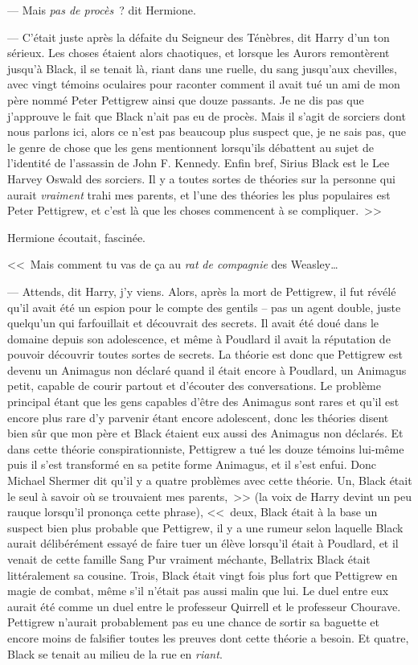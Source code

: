 --- Mais \emph{pas de procès}~? dit Hermione.

--- C'était juste après la défaite du Seigneur des Ténèbres, dit Harry d'un ton sérieux. Les choses étaient alors chaotiques, et lorsque les Aurors remontèrent jusqu'à Black, il se tenait là, riant dans une ruelle, du sang jusqu'aux chevilles, avec vingt témoins oculaires pour raconter comment il avait tué un ami de mon père nommé Peter Pettigrew ainsi que douze passants. Je ne dis pas que j'approuve le fait que Black n'ait pas eu de procès. Mais il s'agit de sorciers dont nous parlons ici, alors ce n'est pas beaucoup plus suspect que, je ne sais pas, que le genre de chose que les gens mentionnent lorsqu'ils débattent au sujet de l'identité de l'assassin de John F. Kennedy. Enfin bref, Sirius Black est le Lee Harvey Oswald des sorciers. Il y a toutes sortes de théories sur la personne qui aurait \emph{vraiment} trahi mes parents, et l'une des théories les plus populaires est Peter Pettigrew, et c'est là que les choses commencent à se compliquer.~>>

Hermione écoutait, fascinée.

<<~Mais comment tu vas de ça au \emph{rat} \emph{de compagnie} des Weasley…

--- Attends, dit Harry, j'y viens. Alors, après la mort de Pettigrew, il fut révélé qu'il avait été un espion pour le compte des gentils -- pas un agent double, juste quelqu'un qui farfouillait et découvrait des secrets. Il avait été doué dans le domaine depuis son adolescence, et même à Poudlard il avait la réputation de pouvoir découvrir toutes sortes de secrets. La théorie est donc que Pettigrew est devenu un Animagus non déclaré quand il était encore à Poudlard, un Animagus petit, capable de courir partout et d'écouter des conversations. Le problème principal étant que les gens capables d'être des Animagus sont rares et qu'il est encore plus rare d'y parvenir étant encore adolescent, donc les théories disent bien sûr que mon père et Black étaient eux aussi des Animagus non déclarés. Et dans cette théorie conspirationniste, Pettigrew a tué les douze témoins lui-même puis il s'est transformé en sa petite forme Animagus, et il s'est enfui. Donc Michael Shermer dit qu'il y a quatre problèmes avec cette théorie. Un, Black était le seul à savoir où se trouvaient mes parents,~>> (la voix de Harry devint un peu rauque lorsqu'il prononça cette phrase), <<~deux, Black était à la base un suspect bien plus probable que Pettigrew, il y a une rumeur selon laquelle Black aurait délibérément essayé de faire tuer un élève lorsqu'il était à Poudlard, et il venait de cette famille Sang Pur vraiment méchante, Bellatrix Black était littéralement sa cousine. Trois, Black était vingt fois plus fort que Pettigrew en magie de combat, même s'il n'était pas aussi malin que lui. Le duel entre eux aurait été comme un duel entre le professeur Quirrell et le professeur Chourave. Pettigrew n'aurait probablement pas eu une chance de sortir sa baguette et encore moins de falsifier toutes les preuves dont cette théorie a besoin. Et quatre, Black se tenait au milieu de la rue en \emph{riant}.


